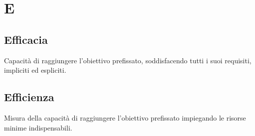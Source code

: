 \section*{E}

\subsection{Efficacia}
Capacità di raggiungere l'obiettivo prefissato, soddisfacendo tutti i suoi requisiti, impliciti ed espliciti.

\subsection{Efficienza}
Misura della capacità di raggiungere l'obiettivo prefissato impiegando le risorse minime indispensabili.
